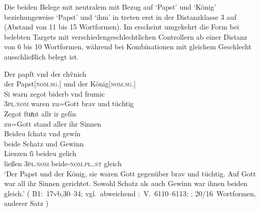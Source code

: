 Die beiden Belege mit neutralem  mit Bezug auf  `Papst'
und  `König' beziehungsweise  `Papst' und 
`ihm' in  treten erst in der Distanzklasse 3 auf (Abstand
von 11 bis 15 Wortformen). Im \CAO{} erscheint umgekehrt die Form 
bei belebten Targets mit verschieden\-geschlechtlichen Controllern
ab einer Distanz von 6 bis 10 Wortformen, während bei Kombinationen mit
gleichem Geschlecht ausschließlich
 belegt ist.

\begin{exe}
\ex \label{ex:combgenddist2}
	\begin{xlist}
	\ex\label{ex:papstkoenig6} %
		\gll Der papſt vnd der chv̂nich \\
			der Papst[\textsc{nom.sg.\MascM}] und der
			König[\textsc{nom.sg.\MascM}] \\
	\sn \gll Si warn zegot biderb vnd frumic \\
			\textsc{3pl\subM.nom} waren {zu=Gott} brav und tüchtig \\
	\sn \gll Zegot ſtuͦnt allr ir geſín \\
			{zu=Gott} stand aller ihr Sinnen \\
	\sn \gll Beideu ſchatz vnd gewín \\
			beide Schatz und Gewinn \\
	\sn \gll Liezzen ſi beideu gelich \\
			ließen \textsc{3pl\subM.nom} beide-\textsc{nom.pl.\NeutM.st}
			gleich \\
		\trans `Der Papst und der König, sie waren Gott gegenüber brav und
			tüchtig. Auf Gott war all ihr Sinnen gerichtet. Sowohl Schatz als
			auch Gewinn war ihnen beiden gleich.'
			(%
				B1:~17vb,30--34; vgl.~abweichend
				\KC:~V.~6110--6113;
				\cite[194]{schroeder1895};
				20/16~Wortformen, anderer Satz%
			)

	\end{xlist}
\end{exe}

